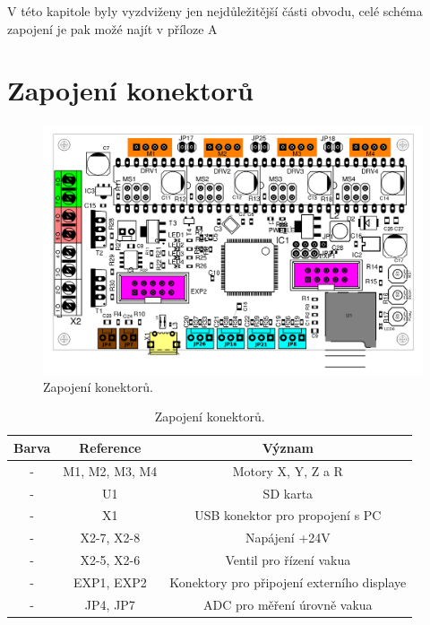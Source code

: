 V této kapitole byly vyzdviženy jen nejdůležitější části obvodu, celé schéma zapojení je pak možé najít v příloze A

\section{Zapojení konektorů}

\begin{figure}[h!]

  \centering
    \includegraphics[width=0.8\linewidth]{obrazky/base3D_barva.png}%
    \caption{Zapojení konektorů.}
\end{figure}



\begin{table}[h!]
  \caption{Zapojení konektorů. }
  \begin{center}
  	\small
	  \begin{tabular}{|c|c|c|}
	    \hline
	    Barva			& Reference			& Význam  					\\
	    \hline\hline
		\cellcolor{blue!25}- 			& M1, M2, M3, M4		& Motory X, Y, Z a R				\\
		\hline
		-			& U1				& SD karta					\\
		\hline
		-			& X1				& USB konektor pro propojení s PC		\\
		\hline
		-			& X2-7, X2-8			& Napájení +24V					\\
		\hline
		-			& X2-5, X2-6			& Ventil pro řízení vakua			\\
		\hline
		-			& EXP1, EXP2			& Konektory pro připojení externího displaye	\\
		\hline
		-			& JP4, JP7			& ADC pro měření úrovně vakua 			\\
		\hline
	    \hline
	  \end{tabular}
  \end{center}
\end{table}

